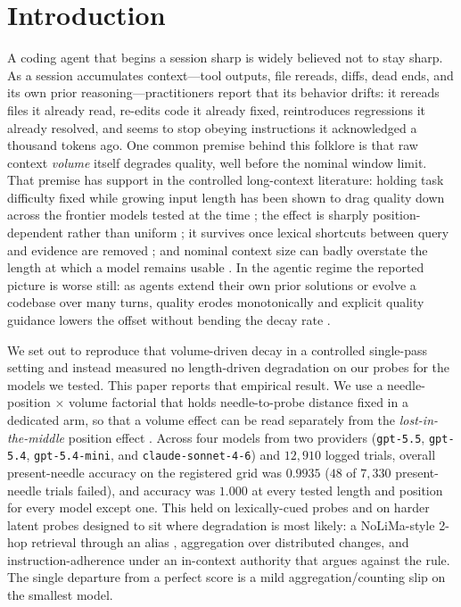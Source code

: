\documentclass[11pt]{article}
\begin{document}
\begin{abstract}
fully disentangled even with the needle-adjacent arm. External validity is limited: the synthetic harness may be too clean, and the result may age as model versions change.
\end{abstract}

\section{Introduction}
\label{sec:intro}

A coding agent that begins a session sharp is widely believed not to stay sharp. As a session accumulates context---tool outputs, file rereads, diffs, dead ends, and its own prior reasoning---practitioners report that its behavior drifts: it rereads files it already read, re-edits code it already fixed, reintroduces regressions it already resolved, and seems to stop obeying instructions it acknowledged a thousand tokens ago. One common premise behind this folklore is that raw context \emph{volume} itself degrades quality, well before the nominal window limit. That premise has support in the controlled long-context literature: holding task difficulty fixed while growing input length has been shown to drag quality down across the frontier models tested at the time \cite{hong2025contextrot}; the effect is sharply position-dependent rather than uniform \cite{liu2024lostmiddle}; it survives once lexical shortcuts between query and evidence are removed \cite{modarressi2025nolima}; and nominal context size can badly overstate the length at which a model remains usable \cite{hsieh2024ruler}. In the agentic regime the reported picture is worse still: as agents extend their own prior solutions or evolve a codebase over many turns, quality erodes monotonically and explicit quality guidance lowers the offset without bending the decay rate \cite{orlanski2026slopcodebench, deng2026evoclaw}.

We set out to reproduce that volume-driven decay in a controlled single-pass setting and instead measured no length-driven degradation on our probes for the models we tested. This paper reports that empirical result. We use a needle-position $\times$ volume factorial that holds needle-to-probe distance fixed in a dedicated arm, so that a volume effect can be read separately from the \emph{lost-in-the-middle} position effect \cite{liu2024lostmiddle}. Across four models from two providers (\texttt{gpt-5.5}, \texttt{gpt-5.4}, \texttt{gpt-5.4-mini}, and \texttt{claude-sonnet-4-6}) and $12{,}910$ logged trials, overall present-needle accuracy on the registered grid was $0.9935$ ($48$ of $7{,}330$ present-needle trials failed), and accuracy was $1.000$ at every tested length and position for every model except one. This held on lexically-cued probes and on harder latent probes designed to sit where degradation is most likely: a NoLiMa-style 2-hop retrieval through an alias \cite{modarressi2025nolima}, aggregation over distributed changes, and instruction-adherence under an in-context authority that argues against the rule. The single departure from a perfect score is a mild aggregation/counting slip on the smallest model.
\end{document}
